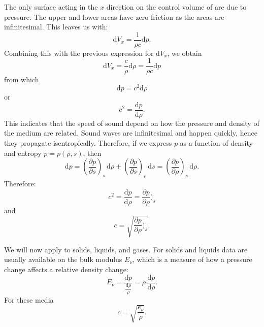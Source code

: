 The only surface acting in the $x$ direction on the control volume of  are due to pressure.
The upper and lower areas have zero friction as the areas are infinitesimal.
This leaves us with:
\begin{equation*}
  \mathrm{d}V_{x} = \frac{1}{\rho c} \mathrm{d}p
.\end{equation*}
Combining this with the previous expression for $\mathrm{d}V_x$, we obtain
\begin{equation*}
  \mathrm{d}V_x = \frac{c}{\rho} \mathrm{d}\rho = \frac{1}{\rho c} \mathrm{d}p
\end{equation*}
from which
\begin{equation*}
  \mathrm{d}p = c^2 \mathrm{d}\rho
\end{equation*}
or
\begin{equation*}
  c^2 = \frac{\mathrm{d}p}{\mathrm{d}\rho}
.\end{equation*}
This indicates that the speed of sound depend on how the pressure and density of the medium are related.
Sound waves are infinitesimal and happen quickly, hence they propagate isentropically.
Therefore, if we express $p$ as a function of density and entropy $p = p(\rho,s)$, then
\begin{equation*}
  \mathrm{d}p = \left( \frac{\partial p}{\partial s}\right)_s \,  \mathrm{d}\rho + \left( \frac{\partial p}{\partial s}  \right)_{\rho} \, \mathrm{d}s = \left( \frac{\partial p}{\partial \rho} \right)_s \, \mathrm{d}\rho
.\end{equation*}
Therefore:
\begin{equation*}
  c^2 = \frac{\mathrm{d}p}{\mathrm{d}\rho} =  \frac{\partial p}{\partial \rho}  \bigg)_s
\end{equation*}
and
\begin{equation} \label{eq:sos}
  c = \sqrt{\frac{\partial p}{\partial \rho} \bigg)_s}
.\end{equation}

We will now apply  to solids, liquids, and gases.
For solids and liquids data are usually available on the bulk modulus $E_{\nu}$, which is a measure of how a pressure change affects a relative density change:
\begin{equation*}
  E_{\nu} = \frac{\mathrm{d}p}{\frac{\mathrm{d}\rho}{\rho}} = \rho \, \frac{\mathrm{d}p}{\mathrm{d}\rho}
.\end{equation*}
For these media
\begin{equation}
  c = \sqrt{\frac{e_{\nu}}{\rho}}
.\end{equation}

